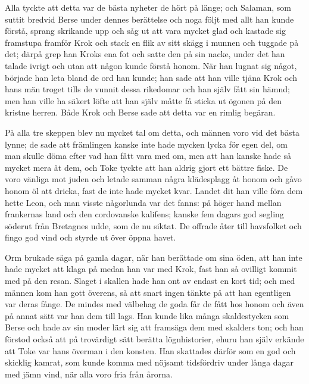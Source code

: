 \initial Alla tyckte att detta var de bästa nyheter de hört på länge; och Salaman, som suttit bredvid Berse under dennes berättelse och noga följt med allt han kunde förstå, sprang skrikande upp och såg ut att vara mycket glad och kastade sig framstupa framför Krok och stack en flik av sitt skägg i munnen och tuggade på det; därpå grep han Kroks ena fot och satte den på sin nacke, under det han talade ivrigt och utan att någon kunde förstå honom. När han lugnat sig något, började han leta bland de ord han kunde; han sade att han ville tjäna Krok och hans män troget tills de vunnit dessa rikedomar och han själv fått sin hämnd; men han ville ha säkert löfte att han själv måtte få sticka ut ögonen på den kristne herren. Både Krok och Berse sade att detta var en rimlig begäran.

\initial På alla tre skeppen blev nu mycket tal om detta, och männen voro vid det bästa lynne; de sade att främlingen kanske inte hade mycken lycka för egen del, om man skulle döma efter vad han fått vara med om, men att han kanske hade så mycket mera åt dem, och Toke tyckte att han aldrig gjort ett bättre fiske. De voro vänliga mot juden och letade samman några klädesplagg åt honom och gåvo honom öl att dricka, fast de inte hade mycket kvar. Landet dit han ville föra dem hette Leon, och man visste någorlunda var det fanns: på höger hand mellan frankernas land och den cordovanske kalifens; kanske fem dagars god segling söderut från Bretagnes udde, som de nu siktat. De offrade åter till havsfolket och fingo god vind och styrde ut över öppna havet.

%
%


\initial Orm brukade säga på gamla dagar, när han berättade om sina öden, att han inte hade mycket att klaga på medan han var med Krok, fast han så ovilligt kommit med på den resan. Slaget i skallen hade han ont av endast en kort tid; och med männen kom han gott överens, så att snart ingen tänkte på att han egentligen var deras fånge. De mindes med välbehag de goda får de fått hos honom och även på annat sätt var han dem till lags. Han kunde lika många skaldestycken som Berse och hade av sin moder lärt sig att framsäga dem med skalders ton; och han förstod också att på trovärdigt sätt berätta lögnhistorier, ehuru han själv erkände att Toke var hans överman i den konsten. Han skattades därför som en god och skicklig kamrat, som kunde komma med nöjsamt tidsfördriv under långa dagar med jämn vind, när alla voro fria från årorna.

